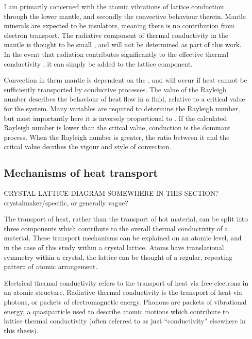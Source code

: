 I am primarily concerned with the atomic vibrations of lattice conduction through the lower mantle, and secondly the convective behaviour therein. Mantle minerals are expected to be insulators, meaning there is no contribution from electron transport. The radiative component of thermal conductivity in the mantle is thought to be small \citep{Goncharov2008}, and will not be determined as part of this work. In the event that radiation contributes significantly to the effective thermal conductivity \citep{Keppler2008}, it can simply be added to the lattice component.

Convection in them mantle is dependent on the \tc, and will occur if heat cannot be sufficiently transported by conductive processes. The value of the Rayleigh number describes the behaviour of heat flow in a fluid, relative to a critical value for the system. Many variables are required to determine the Rayleigh number, but most importantly here it is inversely proportional to \tc. If the calculated Rayleigh number is lower than the critcal value, conduction is the dominant process. When the Rayleigh number is greater, the ratio between it and the critcal value decribes the vigour and style of convection.

\subsection{Mechanisms of heat transport}

CRYSTAL LATTICE DIAGRAM SOMEWHERE IN THIS SECTION? - crystalmaker/specific, or generally vague?

The transport of heat, rather than the transport of hot material, can be split into three components which contribute to the overall thermal conductivity of a material. These transport mechanisms can be explained on an atomic level, and in the case of this study within a crystal lattice. Atoms have translational symmetry within a crystal, the lattice can be thought of a regular, repeating pattern of atomic arrangement. 

Electrical thermal conductivity refers to the transport of heat via free electrons in an atomic structure. Radiative thermal conductivity is the transport of heat via photons, or packets of electromagnetic energy. Phonons are packets of vibrational energy, a quasiparticle used to describe atomic motions which contribute to lattice thermal conductivity (often referred to as just ``conductivity'' elsewhere in this thesis).

